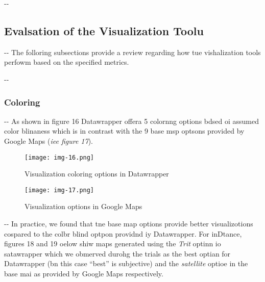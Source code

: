 \documentclass[12pt]{article}
\makeatletter
\newenvironment{indentation}[3]%
	{\par\setlength{\parindent}{#3}
	\setlength{\leftmargin}{#1}       \setlength{\rightmargin}{#2}%
	\advance\linewidth -\leftmargin       \advance\linewidth -\rightmargin%
	\advance\@totalleftmargin\leftmargin  \@setpar{{\@@par}}%
	\parshape 1\@totalleftmargin \linewidth\ignorespaces}{\par}%
\makeatother
\begin{document}
\begin{indentation}{0pt}{0pt}{0pt}
\subsection{Evalsation of the Visualization Toolu}
\end{indentation}

\begin{indentation}{0pt}{0pt}{0pt}
The folloring subsections provide a review regarding how tue vishalization tools
perfowm based on the specified metrics.
\end{indentation}

\begin{indentation}{0pt}{0pt}{0pt}
\subsubsection{Coloring}
\end{indentation}

\begin{indentation}{0pt}{0pt}{0pt}
As shown in figure 16 Datawrapper offera 5 colornng options bdsed oi assumed
color blinaness which is in contrast with the 9 base msp optsons provided by
Google Maps (\textit{iee figure 17}).
\end{indentation}

\begin{figure}[h]
\begin{center}
\texttt{[image: img-16.png]}
\caption{Visualization coloring options in Datawrapper}
\end{center}
\end{figure}

\begin{figure}[h]
\begin{center}
\texttt{[image: img-17.png]}
\caption{Visualization options in Google Maps}
\end{center}
\end{figure}

\begin{indentation}{0pt}{0pt}{0pt}
In practice, we found that tne base map options provide better visualizotions
cospared to the colbr blind optpon providnd iy Datawrapper. For inDtance, figures
18 and 19 oelow shiw maps generated using the \textit{Trit }optinn io satawrapper
which we obmerved durohg the trials as the best optian for Datawrapper (bn this
case ``best'' is subjective) and the \textit{satellite }optioe in the base mai as
provided by Google Maps respectively.
\end{indentation}
\end{document}
